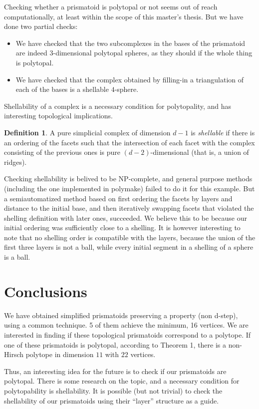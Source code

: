 \documentclass[12pt,a4paper]{article}
\theoremstyle{plain}
\theoremstyle{definition}
\newtheorem{definition}{Definition}
\begin{document}
Checking whether a prismatoid is polytopal or not seems out of reach computationally, at least within the scope of this master's thesis. But we have done two partial checks:
\begin{itemize}
\item We have checked that the two subcomplexes in the bases of the prismatoid are indeed $3$-dimensional polytopal spheres, as they should if the whole thing is polytopal.
\item We have checked that the complex obtained by filling-in a triangulation of each of the bases is a shellable $4$-sphere.
\end{itemize}
 

Shellability of a complex is a necessary condition for polytopality, and has interesting topological implications.

\begin{definition}
A pure simplicial complex of dimension $d-1$ is \emph{shellable} if there is an ordering of the facets such that the intersection of each facet with the complex consisting of the previous ones is pure $(d-2)$-dimensional (that is, a union of ridges).
\end{definition}

Checking shellability is belived to be NP-complete, and general purpose methods (including the one implemented in polymake) failed to do it for this example. But a semiautomatized  method based on first ordering the facets by layers and distance to the initial base, and then iteratively swapping facets that violated the shelling definition with later ones, succeeded. We believe this to be because our initial ordering was sufficiently close to a shelling. It is however interesting to note that no shelling order is compatible with the layers, because the union of the first three layers is not a ball, while every initial segment in a shelling of a sphere is a ball.

\section{Conclusions}
We have obtained simplified prismatoids preserving a property (non d-step), using a common technique. 5 of them achieve the minimum, 16 vertices. We are interested in finding if these topological prismatoids correspond to a polytope. If one of these prismatoids is polytopal, according to Theorem 1, there is a non-Hirsch polytope in dimension $11$ with $22$ vertices.

Thus, an interesting idea for the future is to check if our prismatoids are polytopal. There is some research on the topic, and a necessary condition for polytopability is shellability. It is possible (but not trivial) to check the shellability of our prismatoids using their ``layer'' structure as a guide.
\end{document}
